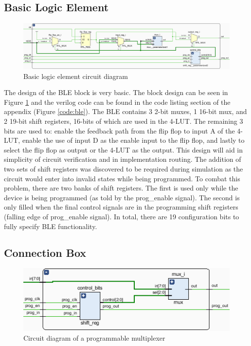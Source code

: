 \documentclass[12pt]{article}
\begin{document}
\subsection{Basic Logic Element}

\begin{figure}[ht]
    \centering
    \includegraphics[width=\textwidth]{ble}
    \caption{Basic logic element circuit diagram}
    \label{fig:ble}
\end{figure}

The design of the BLE block is very basic. The block design can be seen in Figure 
\ref{fig:ble} and the verilog code can be found in the code listing section of the
appendix (Figure \ref{code:ble}). The BLE contains 3 2-bit muxes,
1 16-bit mux, and 2 19-bit shift registers, 16-bits of which are used in the
4-LUT. The remaining 3 bits are used to: enable the feedback path from the flip flop 
to input A of the 4-LUT, enable the use of input D as the enable input to the flip 
flop, and lastly to select the flip flop as output or the 4-LUT as the output. This 
design will aid in simplicity of circuit verification and in implementation routing.
The addition of two sets of shift registers was discovered to be required during 
simulation as the circuit would enter into invalid states while being programmed. 
To combat this problem, there are two banks of shift registers. The first is used 
only while the device is being programmed (as told by the prog{\_}enable signal). The 
second is only filled when the final control signals are in the programming shift 
registers (falling edge of prog{\_}enable signal). In total, there are 19 configuration
bits to fully specify BLE functionality.

\subsection{Connection Box}

\begin{figure}[ht]
    \centering
    \includegraphics[width=\textwidth]{prog_mux}
    \caption{Circuit diagram of a programmable multiplexer}
    \label{fig:prog_mux}
\end{figure}
\end{document}
